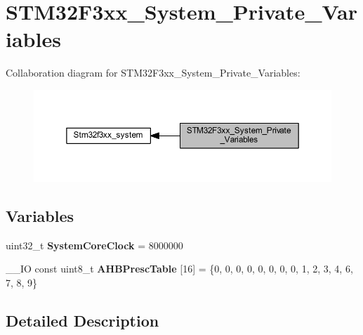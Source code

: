 \hypertarget{group___s_t_m32_f3xx___system___private___variables}{}\section{S\+T\+M32\+F3xx\+\_\+\+System\+\_\+\+Private\+\_\+\+Variables}
\label{group___s_t_m32_f3xx___system___private___variables}
Collaboration diagram for S\+T\+M32\+F3xx\+\_\+\+System\+\_\+\+Private\+\_\+\+Variables\+:\nopagebreak
\begin{figure}[H]
\begin{center}
\leavevmode
\includegraphics[width=350pt]{group___s_t_m32_f3xx___system___private___variables}
\end{center}
\end{figure}
\subsection*{Variables}
\begin{DoxyCompactItemize}
\item 
\hypertarget{group___s_t_m32_f3xx___system___private___variables_gaa3cd3e43291e81e795d642b79b6088e6}{}uint32\+\_\+t {\bfseries System\+Core\+Clock} = 8000000\label{group___s_t_m32_f3xx___system___private___variables_gaa3cd3e43291e81e795d642b79b6088e6}

\item 
\hypertarget{group___s_t_m32_f3xx___system___private___variables_ga6f9c3580a063d25bfc3acae1db341b12}{}\+\_\+\+\_\+\+I\+O const uint8\+\_\+t {\bfseries A\+H\+B\+Presc\+Table} \mbox{[}16\mbox{]} = \{0, 0, 0, 0, 0, 0, 0, 0, 1, 2, 3, 4, 6, 7, 8, 9\}\label{group___s_t_m32_f3xx___system___private___variables_ga6f9c3580a063d25bfc3acae1db341b12}

\end{DoxyCompactItemize}


\subsection{Detailed Description}

